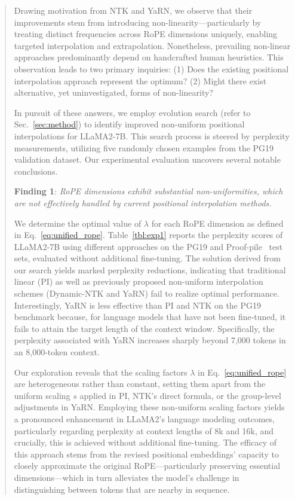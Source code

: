 \begin{abstract}
Drawing motivation from NTK and YaRN, we observe that their improvements stem from introducing non-linearity—particularly by treating distinct frequencies across RoPE dimensions uniquely, enabling targeted interpolation and extrapolation. Nonetheless, prevailing non-linear approaches predominantly depend on handcrafted human heuristics. This observation leads to two primary inquiries: (1) Does the existing positional interpolation approach represent the optimum? (2) Might there exist alternative, yet uninvestigated, forms of non-linearity?

In pursuit of these answers, we employ evolution search (refer to Sec.~\ref{sec:method}) to identify improved non-uniform positional interpolations for LLaMA2-7B. This search process is steered by perplexity measurements, utilizing five randomly chosen examples from the PG19~\cite{pg19} validation dataset. Our experimental evaluation uncovers several notable conclusions.

\textbf{Finding 1}: \textit{RoPE dimensions exhibit substantial non-uniformities, which are not effectively handled by current positional interpolation methods.}

We determine the optimal value of $\lambda$ for each RoPE dimension as defined in Eq.~\ref{eq:unified_rope}. Table~\ref{tbl:exp1} reports the perplexity scores of LLaMA2-7B using different approaches on the PG19 and Proof-pile~\cite{proof-pile} test sets, evaluated without additional fine-tuning. The solution derived from our search yields marked perplexity reductions, indicating that traditional linear (PI) as well as previously proposed non-uniform interpolation schemes (Dynamic-NTK and YaRN) fail to realize optimal performance. Interestingly, YaRN is less effective than PI and NTK on the PG19 benchmark because, for language models that have not been fine-tuned, it fails to attain the target length of the context window. Specifically, the perplexity associated with YaRN increases sharply beyond 7,000 tokens in an 8,000-token context.

Our exploration reveals that the scaling factors $\lambda$ in Eq.~\ref{eq:unified_rope} are heterogeneous rather than constant, setting them apart from the uniform scaling $s$ applied in PI, NTK’s direct formula, or the group-level adjustments in YaRN. Employing these non-uniform scaling factors yields a pronounced enhancement in LLaMA2’s language modeling outcomes, particularly regarding perplexity at context lengths of 8k and 16k, and crucially, this is achieved without additional fine-tuning. The efficacy of this approach stems from the revised positional embeddings' capacity to closely approximate the original RoPE—particularly preserving essential dimensions—which in turn alleviates the model's challenge in distinguishing between tokens that are nearby in sequence.


\end{abstract}
